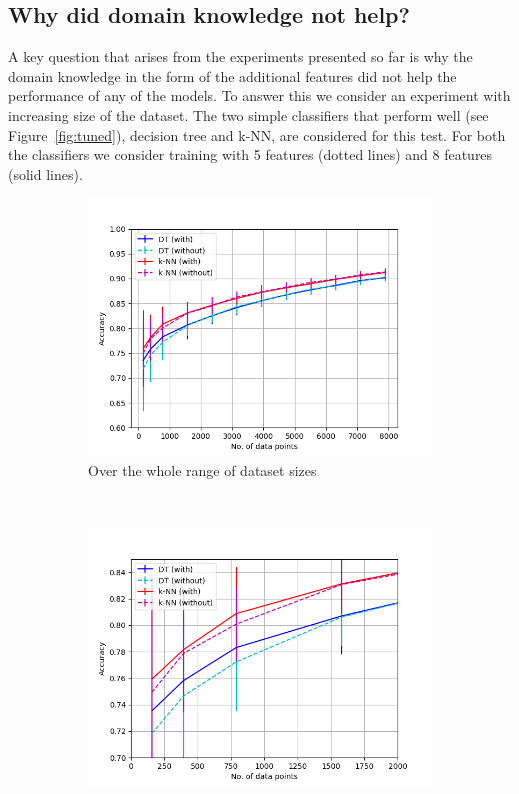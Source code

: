 \documentclass{article}
\begin{document}
\subsection{Why did domain knowledge not help?}
A key question that arises from the experiments presented so far is why the domain knowledge in the form of the additional features did not help the performance of any of the models. To answer this we consider an experiment with increasing size of the dataset. The two simple classifiers that perform well (see Figure~\ref{fig:tuned}), decision tree and k-NN, are considered for this test. For both the classifiers we consider training with 5 features (dotted lines) and 8 features (solid lines). 


\begin{figure}[h!]
    \centering
    \begin{subfigure}[b]{0.475\textwidth}
        \includegraphics[width=\textwidth]{../figures/accuracy_vs_size.png}
        \caption{Over the whole range of dataset sizes}
        \label{fig:acc_vs_size_a}
    \end{subfigure}
    ~ %
    \begin{subfigure}[b]{0.475\textwidth}
        \includegraphics[width=\textwidth]{../figures/accuracy_vs_size2.png}

\end{subfigure}
\end{figure}
\end{document}
